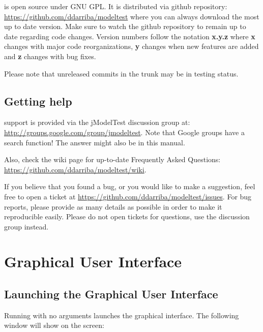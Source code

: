 \documentclass[10pt,twoside,a4paper]{article}
\begin{document}
\modeltest is open source under GNU GPL. 
It is distributed via github repository:
\url{https://github.com/ddarriba/modeltest} where you can always download the most up to date version. 
Make sure to watch the github repository to remain up to date regarding code changes.
Version numbers follow the notation {\bf x.y.z} where {\bf x} changes with major code reorganizations, {\bf y}
changes when new features are added and {\bf z} changes with bug fixes.

Please note that unreleased commits in the trunk may be in testing status.

\subsection{Getting help}

\modeltest support is provided via the jModelTest discussion group at: \url{http://groups.google.com/group/jmodeltest}.  Note that Google groups have a search function! The answer might also be in this manual.

Also, check the wiki page for up-to-date Frequently Asked Questions: \url{https://github.com/ddarriba/modeltest/wiki}.

If you believe that you found a bug, or you would like to make a suggestion, feel free to open a ticket at \url{https://github.com/ddarriba/modeltest/issues}. 
For bug reports, please provide as many details as possible in order to make it reproducible easily.
Please do not open tickets for questions, use the discussion group instead.





\section{Graphical User Interface}
\label{sec:gui}

\subsection{Launching the Graphical User Interface}

Running {\modeltestguibin} with no arguments launches the graphical interface.
The following window will show on the screen:
\end{document}
